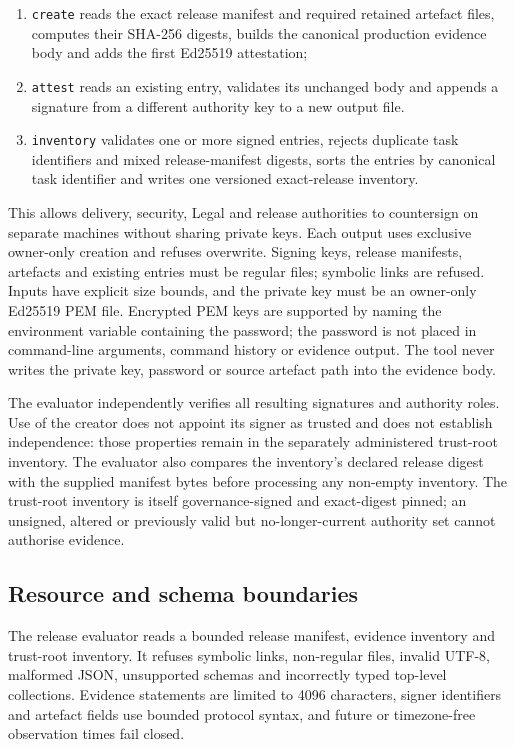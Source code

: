 \begin{enumerate}
  \item \texttt{create} reads the exact release manifest and required retained
        artefact files, computes their SHA-256 digests, builds the canonical
        production evidence body and adds the first Ed25519 attestation;
  \item \texttt{attest} reads an existing entry, validates its unchanged body and
        appends a signature from a different authority key to a new output file.
  \item \texttt{inventory} validates one or more signed entries, rejects duplicate
        task identifiers and mixed release-manifest digests, sorts the entries by
        canonical task identifier and writes one versioned exact-release inventory.
\end{enumerate}

This allows delivery, security, Legal and release authorities to countersign on
separate machines without sharing private keys.  Each output uses exclusive
owner-only creation and refuses overwrite.  Signing keys, release manifests,
artefacts and existing entries must be regular files; symbolic links are refused.
Inputs have explicit size bounds, and the private key must be an owner-only
Ed25519 PEM file.  Encrypted PEM keys are supported by naming the environment
variable containing the password; the password is not placed in command-line
arguments, command history or evidence output.  The tool never writes the private
key, password or source artefact path into the evidence body.

The evaluator independently verifies all resulting signatures and authority roles.
Use of the creator does not appoint its signer as trusted and does not establish
independence: those properties remain in the separately administered trust-root
inventory.  The evaluator also compares the inventory's declared release digest
with the supplied manifest bytes before processing any non-empty inventory.
The trust-root inventory is itself governance-signed and exact-digest pinned; an
unsigned, altered or previously valid but no-longer-current authority set cannot
authorise evidence.

\subsection{Resource and schema boundaries}

The release evaluator reads a bounded release manifest, evidence inventory and
trust-root inventory.  It refuses symbolic links, non-regular files, invalid UTF-8,
malformed JSON, unsupported schemas and incorrectly typed top-level collections.
Evidence statements are limited to 4096 characters, signer identifiers and
artefact fields use bounded protocol syntax, and future or timezone-free
observation times fail closed.

